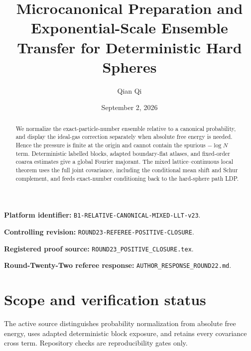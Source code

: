 \documentclass[11pt,reqno]{amsart}
\title[Microcanonical hard-sphere preparation]{Microcanonical Preparation and Exponential-Scale Ensemble Transfer for Deterministic Hard Spheres}
\author{Qian Qi}
\date{September 2, 2026}
\theoremstyle{definition}
\theoremstyle{remark}
\begin{document}
\raggedbottom
\begin{abstract}
We normalize the exact-particle-number ensemble relative to a canonical
probability, and display the ideal-gas correction separately when absolute
free energy is needed.  Hence the pressure is finite at the origin and cannot
contain the spurious $-\log N$ term.  Deterministic labelled blocks, adapted
boundary-flat atlases, and fixed-order coarea estimates give a global Fourier
majorant.  The mixed lattice--continuous local theorem uses the full joint
covariance, including the conditional mean shift and Schur complement, and
feeds exact-number conditioning back to the hard-sphere path LDP.
\end{abstract}
\maketitle
\noindent\textbf{Platform identifier:} \texttt{B1-RELATIVE-CANONICAL-MIXED-LLT-v23}.\par
\noindent\textbf{Controlling revision:} \texttt{ROUND23-REFEREE-POSITIVE-CLOSURE}.\par
\noindent\textbf{Registered proof source:} \texttt{ROUND23\_POSITIVE\_CLOSURE.tex}.\par
\noindent\textbf{Round-Twenty-Two referee response:} \texttt{AUTHOR\_RESPONSE\_ROUND22.md}.\par
\tableofcontents

\section*{Scope and verification status}
The active source distinguishes probability normalization from absolute free
energy, uses adapted deterministic block exposure, and retains every covariance
cross term. Repository checks are reproducibility gates only.
\printbibliography
\end{document}
